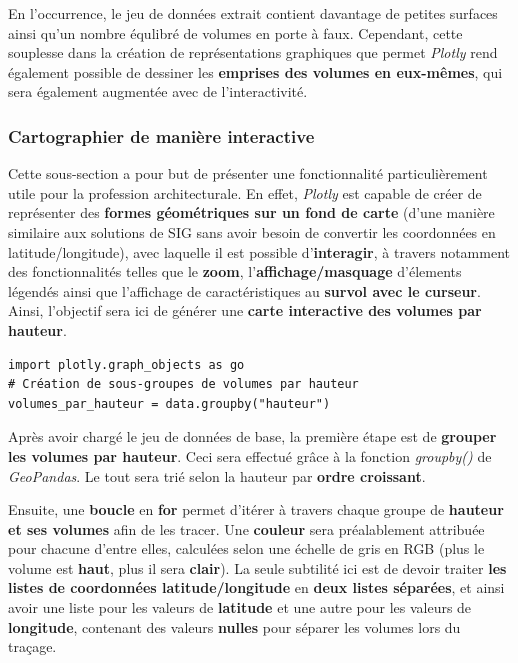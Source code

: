 \documentclass[
  11pt,
  french,
]{article}
\begin{document}
En l'occurrence, le jeu de données extrait contient davantage de petites
surfaces ainsi qu'un nombre équlibré de volumes en porte à faux.
Cependant, cette souplesse dans la création de représentations
graphiques que permet \emph{Plotly} rend également possible de dessiner
les \textbf{emprises des volumes en eux-mêmes}, qui sera également
augmentée avec de l'interactivité.

\hypertarget{cartographier-de-maniuxe8re-interactive}{%
\subsubsection{Cartographier de manière
interactive}\label{cartographier-de-maniuxe8re-interactive}}

Cette sous-section a pour but de présenter une fonctionnalité
particulièrement utile pour la profession architecturale. En effet,
\emph{Plotly} est capable de créer de représenter des \textbf{formes
géométriques sur un fond de carte} (d'une manière similaire aux
solutions de SIG sans avoir besoin de convertir les coordonnées en
latitude/longitude), avec laquelle il est possible d'\textbf{interagir},
à travers notamment des fonctionnalités telles que le \textbf{zoom},
l'\textbf{affichage/masquage} d'élements légendés ainsi que l'affichage
de caractéristiques au \textbf{survol avec le curseur}. Ainsi,
l'objectif sera ici de générer une \textbf{carte interactive des volumes
par hauteur}.

\begin{tcolorbox}[title= Répartition des volumes selon leurs caractéristiques ,colback=boitecode]
\begin{lstlisting}[style=code]
import plotly.graph_objects as go
# Création de sous-groupes de volumes par hauteur
volumes_par_hauteur = data.groupby("hauteur")\end{lstlisting}
\end{tcolorbox}

Après avoir chargé le jeu de données de base, la première étape est de
\textbf{grouper les volumes par hauteur}. Ceci sera effectué grâce à la
fonction \emph{groupby()} de \emph{GeoPandas}. Le tout sera trié selon
la hauteur par \textbf{ordre croissant}.

Ensuite, une \textbf{boucle} en \textbf{for} permet d'itérer à travers
chaque groupe de \textbf{hauteur et ses volumes} afin de les tracer. Une
\textbf{couleur} sera préalablement attribuée pour chacune d'entre
elles, calculées selon une échelle de gris en RGB (plus le volume est
\textbf{haut}, plus il sera \textbf{clair}). La seule subtilité ici est
de devoir traiter \textbf{les listes de coordonnées latitude/longitude}
en \textbf{deux listes séparées}, et ainsi avoir une liste pour les
valeurs de \textbf{latitude} et une autre pour les valeurs de
\textbf{longitude}, contenant des valeurs \textbf{nulles} pour séparer
les volumes lors du traçage.\\
\end{document}
